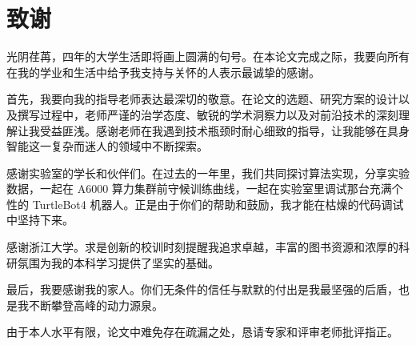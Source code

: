 \cleardoublepage

\section*{致谢}

光阴荏苒，四年的大学生活即将画上圆满的句号。在本论文完成之际，我要向所有在我的学业和生活中给予我支持与关怀的人表示最诚挚的感谢。

首先，我要向我的指导老师表达最深切的敬意。在论文的选题、研究方案的设计以及撰写过程中，老师严谨的治学态度、敏锐的学术洞察力以及对前沿技术的深刻理解让我受益匪浅。感谢老师在我遇到技术瓶颈时耐心细致的指导，让我能够在具身智能这一复杂而迷人的领域中不断探索。

感谢实验室的学长和伙伴们。在过去的一年里，我们共同探讨算法实现，分享实验数据，一起在 A6000 算力集群前守候训练曲线，一起在实验室里调试那台充满个性的 TurtleBot4 机器人。正是由于你们的帮助和鼓励，我才能在枯燥的代码调试中坚持下来。

感谢浙江大学。求是创新的校训时刻提醒我追求卓越，丰富的图书资源和浓厚的科研氛围为我的本科学习提供了坚实的基础。

最后，我要感谢我的家人。你们无条件的信任与默默的付出是我最坚强的后盾，也是我不断攀登高峰的动力源泉。

由于本人水平有限，论文中难免存在疏漏之处，恳请专家和评审老师批评指正。
